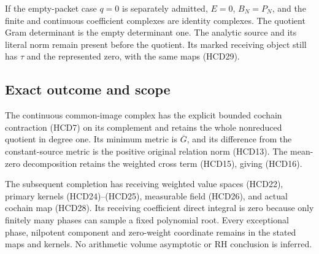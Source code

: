 If the empty-packet case $q=0$ is separately admitted,
$E=0$, $B_N=P_N$, and the finite and continuous coefficient
complexes are identity complexes. The quotient Gram
determinant is the empty determinant one. The analytic
source and its literal norm remain present before the
quotient. Its marked receiving object still has $\tau$
and the represented zero, with the same maps (HCD29).

\subsection{Exact outcome and scope}

The continuous common-image complex has the explicit bounded
cochain contraction (HCD7) on its complement and retains
the whole nonreduced quotient in degree one.
Its minimum metric is $\overline G$, and its difference
from the constant-source metric is the positive original
relation norm (HCD13). The mean-zero decomposition retains
the weighted cross term (HCD15), giving (HCD16).

The subsequent completion has receiving weighted value
spaces (HCD22), primary kernels (HCD24)--(HCD25), measurable
field (HCD26), and actual cochain map (HCD28).
Its receiving coefficient direct integral is zero because
only finitely many phases can sample a fixed polynomial root.
Every exceptional phase, nilpotent component and zero-weight
coordinate remains in the stated maps and kernels.
No arithmetic volume asymptotic or RH conclusion is inferred.


\endgroup
